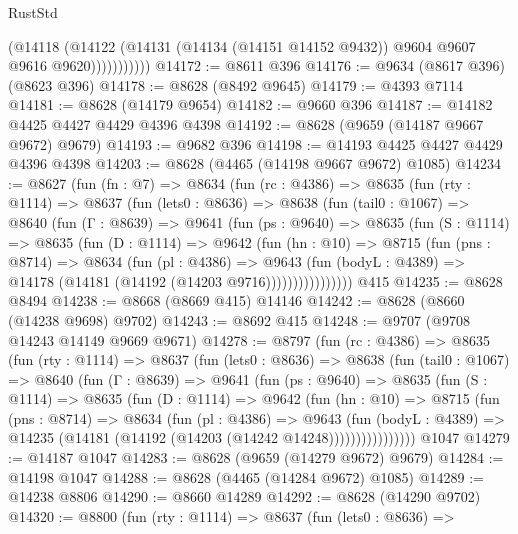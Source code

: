 \begin{lexlean}{RustStd}
\begin{coremodule}
                    (@14118
                      (@14122
                        (@14131 (@14134 (@14151 @14152 @9432)) @9604 @9607 @9616 @9620)))))))))))
@14172 := @8611 @396
@14176 := @9634 (@8617 @396) (@8623 @396)
@14178 := @8628 (@8492 @9645)
@14179 := @4393 @7114
@14181 := @8628 (@14179 @9654)
@14182 := @9660 @396
@14187 := @14182 @4425 @4427 @4429 @4396 @4398
@14192 := @8628 (@9659 (@14187 @9667 @9672) @9679)
@14193 := @9682 @396
@14198 := @14193 @4425 @4427 @4429 @4396 @4398
@14203 := @8628 (@4465 (@14198 @9667 @9672) @1085)
@14234 := @8627
    (fun (fn : @7) =>
    @8634
      (fun (rc : @4386) =>
      @8635
        (fun (rty : @1114) =>
        @8637
          (fun (lets0 : @8636) =>
          @8638
            (fun (tail0 : @1067) =>
            @8640
              (fun (Γ : @8639) =>
              @9641
                (fun (ps : @9640) =>
                @8635
                  (fun (S : @1114) =>
                  @8635
                    (fun (D : @1114) =>
                    @9642
                      (fun (hn : @10) =>
                      @8715
                        (fun (pns : @8714) =>
                        @8634
                          (fun (pl : @4386) =>
                          @9643
                            (fun (bodyL : @4389) =>
                            @14178 (@14181 (@14192 (@14203 @9716))))))))))))))))
    @415
@14235 := @8628 @8494
@14238 := @8668 (@8669 @415) @14146
@14242 := @8628 (@8660 (@14238 @9698) @9702)
@14243 := @8692 @415
@14248 := @9707 (@9708 @14243 @14149 @9669 @9671)
@14278 := @8797
    (fun (rc : @4386) =>
    @8635
      (fun (rty : @1114) =>
      @8637
        (fun (lets0 : @8636) =>
        @8638
          (fun (tail0 : @1067) =>
          @8640
            (fun (Γ : @8639) =>
            @9641
              (fun (ps : @9640) =>
              @8635
                (fun (S : @1114) =>
                @8635
                  (fun (D : @1114) =>
                  @9642
                    (fun (hn : @10) =>
                    @8715
                      (fun (pns : @8714) =>
                      @8634
                        (fun (pl : @4386) =>
                        @9643
                          (fun (bodyL : @4389) =>
                          @14235 (@14181 (@14192 (@14203 (@14242 @14248))))))))))))))))
    @1047
@14279 := @14187 @1047
@14283 := @8628 (@9659 (@14279 @9672) @9679)
@14284 := @14198 @1047
@14288 := @8628 (@4465 (@14284 @9672) @1085)
@14289 := @14238 @8806
@14290 := @8660 @14289
@14292 := @8628 (@14290 @9702)
@14320 := @8800
    (fun (rty : @1114) =>
    @8637
      (fun (lets0 : @8636) =>

\end{coremodule}
\end{lexlean}
